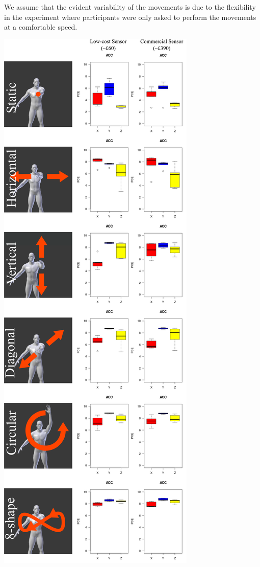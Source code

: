 \documentclass[a0paper,portrait]{baposter}
\begin{document}
\begin{poster}
{We assume that the evident variability of the movements
is due to the flexibility in the experiment where participants
were only asked to perform the movements at a comfortable speed.


\begin{center}
\includegraphics[width=0.94\linewidth]{movements_boxplot_10}
\end{center}


}
\end{poster}
\end{document}

